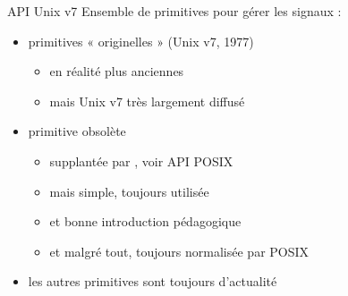 
\begin {frame} {API Unix v7}
    Ensemble de primitives pour gérer les signaux :

    \vspace* {-3mm}


    \vspace* {-2mm}

    \begin {itemize}
	\item primitives « originelles » (Unix v7, 1977)
	    \begin {itemize}
		\item en réalité plus anciennes
		\item mais Unix v7 très largement diffusé

	    \end {itemize}
	\item primitive  obsolète
	    \begin {itemize}
		\item supplantée par , voir API POSIX
		\item mais  simple, toujours utilisée
		\item et bonne introduction pédagogique
		\item et malgré tout, toujours normalisée par POSIX
	    \end {itemize}
	\item les autres primitives sont toujours d'actualité
    \end {itemize}
\end {frame}

